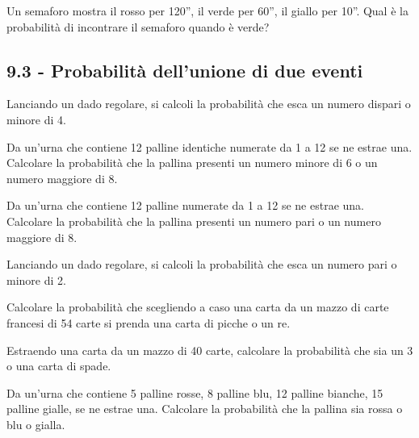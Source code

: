 \begin{esercizio}
 \label{ese:9.27}
Un semaforo mostra il rosso per 120”, il verde per 60”, il giallo per 10”. Qual è la probabilità di incontrare il semaforo quando è verde?
\end{esercizio}

\subsection*{9.3 - Probabilità dell'unione di due eventi}

\begin{esercizio}[\Ast]
 \label{ese:9.28}
 Lanciando un dado regolare, si calcoli la probabilità che esca un numero dispari o minore di 4.
\end{esercizio}

\begin{esercizio}[\Ast]
 \label{ese:9.29}
Da un'urna che contiene 12 palline identiche numerate da 1 a 12 se ne estrae una. Calcolare la probabilità che la pallina presenti un numero minore di 6 o un numero maggiore di 8.
\end{esercizio}

\begin{esercizio}[\Ast]
 \label{ese:9.30}
Da un'urna che contiene 12 palline numerate da 1 a 12 se ne estrae una. Calcolare la probabilità che la pallina presenti un numero pari o un numero maggiore di 8.
\end{esercizio}

\begin{esercizio}[\Ast]
 \label{ese:9.31}
Lanciando un dado regolare, si calcoli la probabilità che esca un numero pari o minore di 2.
\end{esercizio}

\begin{esercizio}[\Ast]
 \label{ese:9.32}
Calcolare la probabilità che scegliendo a caso una carta da un mazzo di carte francesi di 54 carte si prenda una carta di picche o un re.
\end{esercizio}

\begin{esercizio}[\Ast]
 \label{ese:9.33}
Estraendo una carta da un mazzo di 40 carte, calcolare la probabilità che sia un 3 o una carta di spade.
\end{esercizio}

\begin{esercizio}[\Ast]
 \label{ese:9.34}
 Da un'urna che contiene 5 palline rosse, 8 palline blu, 12 palline bianche, 15 palline gialle, se ne estrae una. Calcolare la probabilità che la pallina sia rossa o blu o gialla.
\end{esercizio}

